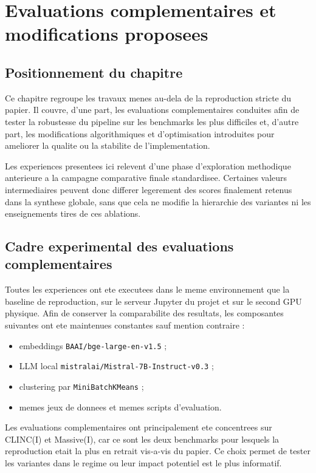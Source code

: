 \chapter{Evaluations complementaires et modifications proposees}

\section{Positionnement du chapitre}

Ce chapitre regroupe les travaux menes au-dela de la reproduction stricte du
papier. Il couvre, d'une part, les evaluations complementaires conduites afin
de tester la robustesse du pipeline sur les benchmarks les plus difficiles et,
d'autre part, les modifications algorithmiques et d'optimisation introduites
pour ameliorer la qualite ou la stabilite de l'implementation.

Les experiences presentees ici relevent d'une phase d'exploration methodique
anterieure a la campagne comparative finale standardisee. Certaines valeurs
intermediaires peuvent donc differer legerement des scores finalement retenus
dans la synthese globale, sans que cela ne modifie la hierarchie des variantes
ni les enseignements tires de ces ablations.

\section{Cadre experimental des evaluations complementaires}

Toutes les experiences ont ete executees dans le meme environnement que la
baseline de reproduction, sur le serveur Jupyter du projet et sur le second GPU
physique. Afin de conserver la comparabilite des resultats, les composantes
suivantes ont ete maintenues constantes sauf mention contraire :
\begin{itemize}[leftmargin=*]
  \item embeddings \texttt{BAAI/bge-large-en-v1.5} ;
  \item LLM local \texttt{mistralai/Mistral-7B-Instruct-v0.3} ;
  \item clustering par \texttt{MiniBatchKMeans} ;
  \item memes jeux de donnees et memes scripts d'evaluation.
\end{itemize}

Les evaluations complementaires ont principalement ete concentrees sur
CLINC(I) et Massive(I), car ce sont les deux benchmarks pour lesquels la
reproduction etait la plus en retrait vis-a-vis du papier. Ce choix permet de
tester les variantes dans le regime ou leur impact potentiel est le plus
informatif.

